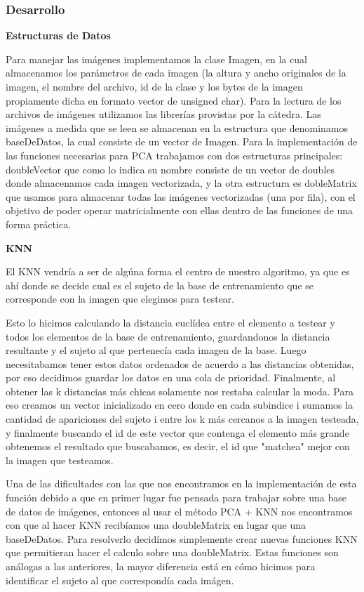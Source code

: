 \subsubsection*{Desarrollo}
\textbf{Estructuras de Datos}

Para manejar las imágenes implementamos la clase Imagen, en la cual almacenamos los parámetros de cada imagen (la altura y ancho originales de la imagen, el nombre del archivo, id de la clase y los bytes de la imagen propiamente dicha en formato vector de unsigned char).
Para la lectura de los archivos de imágenes utilizamos las librerías provistas por la cátedra.
Las imágenes a medida que se leen se almacenan en la estructura que denominamos baseDeDatos, la cual consiste de un vector de Imagen.
Para la implementación de las funciones necesarias para PCA trabajamos con dos estructuras principales: doubleVector que como lo indica su nombre consiste de un vector de doubles donde almacenamos cada imagen vectorizada, y la otra estructura es dobleMatrix que usamos para almacenar todas las imágenes vectorizadas (una por fila), con el objetivo de poder operar matricialmente con ellas dentro de las funciones de una forma práctica.

\textbf{KNN}

El KNN vendría a ser de algúna forma el centro de nuestro algoritmo, ya que es ahí donde se decide cual es el sujeto de la base de entrenamiento que se corresponde con la imagen que elegimos para testear.

Esto lo hicimos calculando la distancia euclídea entre el elemento a testear y todos los elementos de la base de entrenamiento, guardandonos la distancia resultante y el sujeto al que pertenecía cada imagen de la base. Luego necesitabamos tener estos datos ordenados de acuerdo a las distancias obtenidas, por eso decidimos guardar los datos en una cola de prioridad. Finalmente, al obtener las k distancias más chicas solamente nos restaba calcular la moda. Para eso creamos un vector inicializado en cero donde en cada subindice i sumamos la cantidad de apariciones del sujeto i entre los k más cercanos a la imagen testeada, y finalmente buscando el id de este vector que contenga el elemento más grande obtenemos el resultado que buscabamos, es decir, el id que "matchea" mejor con la imagen que testeamos. 

Una de las dificultades con las que nos encontramos en la implementación de esta función debido a que en primer lugar fue pensada para trabajar sobre una base de datos de imágenes, entonces al usar el método PCA + KNN nos encontramos con que al hacer KNN recibíamos una doubleMatrix en lugar que una baseDeDatos.
Para resolverlo decidímos simplemente crear nuevas funciones KNN que permitieran hacer el calculo sobre una doubleMatrix. Estas funciones son análogas a las anteriores, la mayor diferencia está en cómo hicimos para identificar el sujeto al que correspondía cada imágen.

